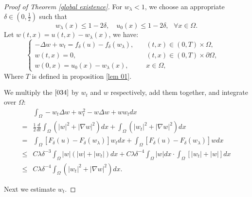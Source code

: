 \documentclass{article}
\numberwithin{equation}{section}
\begin{document}
\begin{proof}[Proof of Theorem \ref{global existence}]
For $w_\lambda<1$, we choose an appropriate $\delta\in\left(0, \frac{1}{2}\right)$ such that
\begin{equation}
w_{\lambda}(x) \le 1-2 \delta ,\quad u_{0}(x) \le 1-2 \delta  ,\text{ } \forall x \in \Omega.\label{033}
\end{equation}
Let $ w(t, x)=u(t, x)-w_{\lambda}(x)$, we have:
\begin{equation}
\left\{\begin{array}{lll}
 -\Delta w+w_{t}=f_{\delta}(u)-f_{\delta}
\left(w_{\lambda}\right),\quad & (t,x) \in(0, T)\times\Omega ,
\\  w(t, x)=0,\quad &(t,x) \in (0, T)\times \partial \Omega,
\\  w(0, x)=u_{0}(x)-w_{\lambda}(x),\quad & x \in\Omega,
\end{array}\quad \right. \label{034}
\end{equation}
Where $T$ is defined in proposition \ref{lem 01}.

We multiply the $\eqref{034}$ by $w_t$ and $w$ respectively, add them together, and integrate over $\Omega$:
\begin{equation}
\begin{aligned}
&\int_{\Omega}-w_t\Delta w+w_{t}^2-w\Delta w+ww_{t} d x
\\=&\frac{1}{2}\frac{d}{d t} \int_{\Omega}\left(|w|^{2}+|\nabla w|^{2}\right) d x+\int_{\Omega}\left(\left|w_{t}\right|^{2}+|\nabla w|^{2}\right) d x \\=&  \int_{\Omega}\left[F_{\delta}(u)-F_{\delta}\left(w_{\lambda}\right)\right] w_{t} d x+\int_{\Omega}\left[F_{\delta}(u)-F_{\delta}\left(w_{\lambda}\right)\right] w d x
\\ \le & C \lambda \delta^{-3} \int_{\Omega}|w|\left(|w|+\left|w_{t}\right|\right) d x+C \lambda \delta^{-4} \int_{\Omega}|w| d x \cdot \int_{\Omega}\left[\left|w_{t}\right|+|w|\right] d x \\ \le & C \lambda \delta^{-4} \int_{\Omega}\left(\left|w_{t}\right|^{2}+|\nabla w|^{2}\right) d x.
\end{aligned}\label{035}
\end{equation}

Next we estimate $w_t$.


\end{proof}
\end{document}
